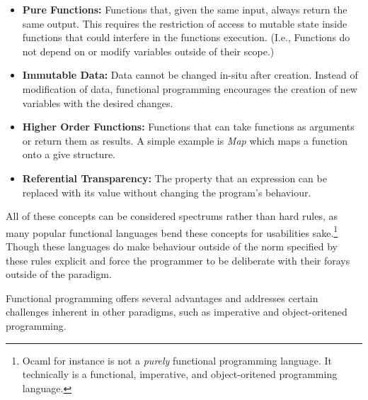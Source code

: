 \documentclass{l4proj}
\begin{document}
\begin{itemize}
    \item \textbf{Pure Functions:} Functions that, given the same input, always return the same output.
    This requires the restriction of access to mutable state inside functions that could interfere in the functions execution.
    (I.e., Functions do not depend on or modify variables outside of their scope.)
    \item \textbf{Immutable Data:} Data cannot be changed in-situ after creation.
    Instead of modification of data, functional programming encourages the creation of new variables with the desired changes.
    \item \textbf{Higher Order Functions:} Functions that can take functions as arguments or return them as results.
    A simple example is \emph{Map} which maps a function onto a give structure.
    \item \textbf{Referential Transparency:} The property that an expression can be replaced with its value without changing the program's behaviour. 
\end{itemize}

All of these concepts can be considered spectrums rather than hard rules, as many popular functional languages bend these concepts for usabilities sake.\footnote{Ocaml for instance is not a \emph{purely} functional programming language. It technically is a functional, imperative, and object-oritened programming language.}
Though these languages do make behaviour outside of the norm specified by these rules explicit and force the programmer to be deliberate with their forays outside of the paradigm.

Functional programming offers several advantages and addresses certain challenges inherent in other paradigms, such as imperative and object-oritened programming. 
\end{document}

